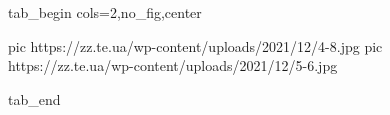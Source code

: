  
 
 
 
 


\ifcmt
  tab_begin cols=2,no_fig,center

     pic https://zz.te.ua/wp-content/uploads/2021/12/4-8.jpg
		 pic https://zz.te.ua/wp-content/uploads/2021/12/5-6.jpg

  tab_end
\fi
